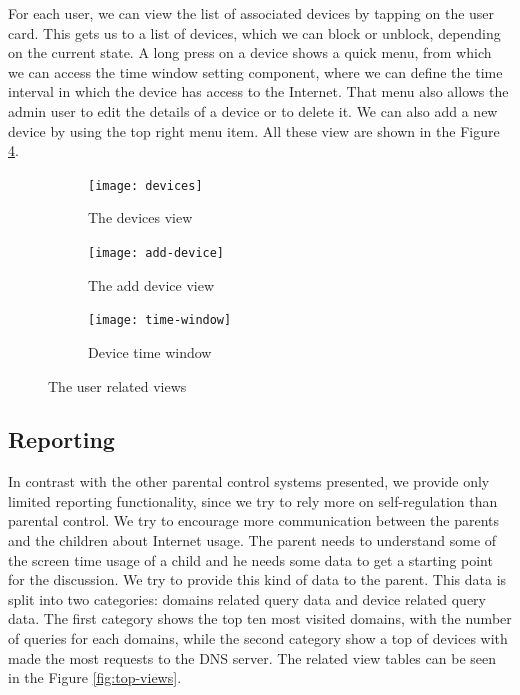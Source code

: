 For each user, we can view the list of associated devices by tapping on the user card. This gets us to a list of devices, which we can block or unblock, depending on the current state. A long press on a device shows a quick menu, from which we can access the time window setting component, where we can define the time interval in which the device has access to the Internet. That menu also allows the admin user to edit the details of a device or to delete it. We can also add a new device by using the top right menu item. All these view are shown in the Figure \ref{fig:device-views}.

\begin{figure}
\centering
\begin{subfigure}{.33\textwidth}
  \centering
  \texttt{[image: devices]}
  \caption{The devices view}
  \label{fig:devices}
\end{subfigure}%
\begin{subfigure}{.33\textwidth}
  \centering
  \texttt{[image: add-device]}
  \caption{The add device view}
  \label{fig:add-device}
\end{subfigure}
\begin{subfigure}{.33\textwidth}
  \centering
  \texttt{[image: time-window]}
  \caption{Device time window}
  \label{fig:time-window}
\end{subfigure}
\caption{The user related views}
\label{fig:device-views}
\end{figure}

\subsection{Reporting}

In contrast with the other parental control systems presented, we provide only limited reporting functionality, since we try to rely more on self-regulation than parental control. We try to encourage more communication between the parents and the children about Internet usage. The parent needs to understand some of the screen time usage of a child and he needs some data to get a starting point for the discussion. We try to provide this kind of data to the parent. This data is split into two categories: domains related query data and device related query data. The first category shows the top ten most visited domains, with the number of queries for each domains, while the second category show a top of devices with made the most requests to the DNS server. The related view tables can be seen in the Figure \ref{fig:top-views}.

